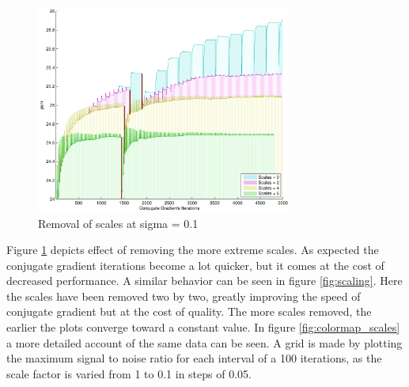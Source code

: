 \documentclass{article}
\begin{document}
\begin{figure}[h]
		\centering
		\includegraphics[width=0.75\textwidth]{img/rem_scales_overview}
		\caption{Removal of scales at sigma = 0.1}
		\label{fig:rem_scales}
\end{figure}%


Figure \ref{fig:rem_scales} depicts effect of removing the more extreme 
scales. As expected the conjugate gradient iterations become a lot 
quicker, but it comes at the cost of decreased performance. A similar 
behavior can be seen in figure \ref{fig:scaling}. Here the scales have 
been removed two by two, greatly improving the speed of conjugate 
gradient but at the cost of quality. The more scales removed, the 
earlier the plots converge toward a constant value. In figure 
\ref{fig:colormap_scales} a more detailed account of the same data can 
be seen.  A grid is made by plotting the maximum signal to noise ratio 
for each interval of a 100 iterations, as the scale factor is varied 
from 1 to 0.1 in steps of 0.05.
\end{document}
